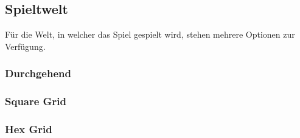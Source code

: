 \subsection{Spieltwelt}
Für die Welt, in welcher das Spiel gespielt wird, stehen mehrere Optionen zur Verfügung. 

\subsubsection{Durchgehend}

\subsubsection{Square Grid}

\subsubsection{Hex Grid}


